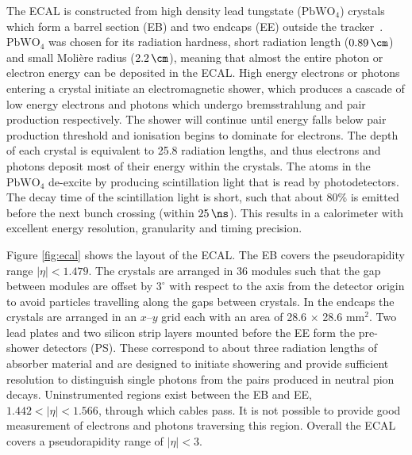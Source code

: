 The \ac{ECAL} is constructed from high density lead tungstate
($\mathrm{PbWO_{4}}$) crystals which form a barrel section (EB) 
and two endcaps (EE) outside the tracker~\cite{Chatrchyan:2008aa}. 
$\mathrm{PbWO_{4}}$ was chosen for its
radiation hardness, short radiation length ($0.89\,\cm$) and small Moli\`ere
radius ($2.2\,\cm$), meaning that almost the entire photon or electron energy
can be deposited in the \ac{ECAL}. High energy electrons or photons
entering a crystal initiate an electromagnetic shower, which produces a cascade
of low energy electrons and photons which undergo bremsstrahlung and pair
production respectively. The shower will continue until energy falls below pair
production threshold and ionisation begins to dominate for electrons. 
The depth of each crystal is equivalent to 25.8 radiation lengths, and
thus electrons and photons deposit most of their energy within the crystals.
The atoms in the $\mathrm{PbWO_{4}}$ de-excite by producing scintillation light that is read by
photodetectors. The decay time of the scintillation light is short, such that
about 80\% is emitted before the next bunch crossing (within $25\,\ns$). This
results in a calorimeter with excellent energy resolution, granularity and timing
precision.

Figure \ref{fig:ecal} shows the layout of the \ac{ECAL}. The EB covers the
pseudorapidity range $|\eta|<1.479$. The crystals are arranged in 36 modules such
that the gap between modules are offset by $3^\circ$ with respect to the axis
from the detector origin to avoid particles travelling along the gaps between
crystals. In
the endcaps the crystals are arranged in an $x$--$y$ grid each with an area of
28.6$\,\times\,$28.6 $\mathrm{mm^{2}}$. Two lead plates and two silicon strip
layers mounted before the EE form the pre-shower detectors (PS). These correspond to about
three radiation lengths of absorber material and are designed to initiate
showering and provide sufficient resolution to distinguish single photons from
the pairs produced in neutral pion decays. Uninstrumented regions exist
between the EB and EE, $1.442 < |\eta| < 1.566$, through which cables pass. It
is not possible to provide good measurement of electrons and photons traversing
this region. Overall the \ac{ECAL} covers a pseudorapidity range of $|\eta|<3$.

